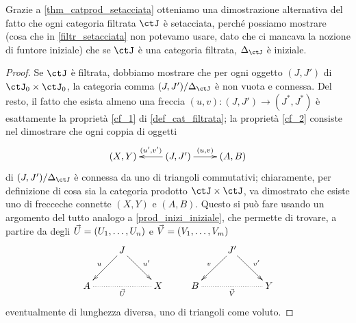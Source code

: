 Grazie a \ref{thm_catprod_setacciata} otteniamo una dimostrazione alternativa del fatto che ogni categoria filtrata \(\ctJ\) è setacciata, perché possiamo mostrare (cosa che in \ref{filtr_setacciata} non potevamo usare, dato che ci mancava la nozione di funtore iniziale) che se \(\ctJ\) è una categoria filtrata, \(\Delta_\ctJ\) è iniziale.
\begin{proof}
	Se \(\ctJ\) è filtrata, dobbiamo mostrare che per ogni oggetto \((J,J')\) di \(\ctJ_0\times\ctJ_0\), la categoria	comma \((J,J')/\Delta_\ctJ\) è non vuota e connessa. Del resto, il fatto che esista almeno una freccia \((u,v) : (J,J') \to (J^*,J^*)\) è esattamente la proprietà \ref{cf_1} di \ref{def_cat_filtrata}; la proprietà \ref{cf_2} consiste nel dimostrare che ogni coppia di oggetti
	\[\xymatrix{
		(X,Y) & (J,J') \ar[r]^-{(u,v)}\ar[l]_-{(u',v')}& (A,B)
		}\]
	di \((J,J')/\Delta_\ctJ\) è connessa da uno \zzg di triangoli commutativi; chiaramente, per definizione di cosa sia la categoria prodotto \(\ctJ\times\ctJ\), va dimostrato che esiste uno \zzg di frecceche connette \((X,Y)\) e \((A,B)\). Questo si può fare usando un argomento del tutto analogo a \ref{prod_inizi_iniziale}, che permette di trovare, a partire da degli \zzg \(\vec U = (\tup Un,)\) e \(\vec V = (\tup Vm,)\)
	\[\xymatrix{
			& J \ar@{->}[rd]^{u'} \ar@{->}[ld]_{u} &  &  & J' \ar@{->}[rd]^{v'} \ar@{->}[ld]_{v} &  \\
			A \ar@{.}[rr]_{\vec U} &  & X & B \ar@{.}[rr]_{\vec V} &  & Y
		}\]
	eventualmente di lunghezza diversa, uno \zzg di triangoli come voluto.
\end{proof}
